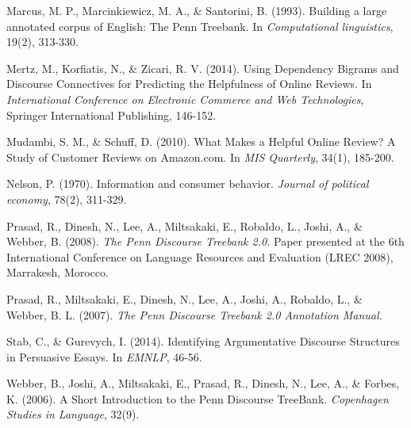 \documentclass[
    a4paper,%
    12pt,%
    oneside,%
    toc=bibliography,
    final,
]{scrartcl}
\begin{document}
\begin{thebibliography}{9}
 Marcus, M. P., Marcinkiewicz, M. A., \& Santorini, B. (1993). Building a large annotated corpus of English: The Penn Treebank. In \textit{Computational linguistics}, 19(2), 313-330.

 Mertz, M., Korfiatis, N., \& Zicari, R. V. (2014). Using Dependency Bigrams and Discourse Connectives for Predicting the Helpfulness of Online Reviews. In \textit{International Conference on Electronic Commerce and Web Technologies}, Springer International Publishing, 146-152.

 Mudambi, S. M., \& Schuff, D. (2010). What Makes a Helpful Online Review? A Study of Customer Reviews on Amazon.com. In \textit{MIS Quarterly}, 34(1), 185-200.

 Nelson, P. (1970). Information and consumer behavior. \textit{Journal of political economy}, 78(2), 311-329.

 Prasad, R., Dinesh, N., Lee, A., Miltsakaki, E., Robaldo, L., Joshi, A., \& Webber, B. (2008). \textit{The Penn Discourse Treebank 2.0.} Paper presented at the 6th International Conference on Language Resources and Evaluation (LREC 2008), Marrakesh, Morocco.

 Prasad, R., Miltsakaki, E., Dinesh, N., Lee, A., Joshi, A., Robaldo, L., \& Webber, B. L. (2007). \textit{The Penn Discourse Treebank 2.0 Annotation Manual.}

 Stab, C., \& Gurevych, I. (2014). Identifying Argumentative Discourse Structures in Persuasive Essays. In \textit{EMNLP}, 46-56.

 Webber, B., Joshi, A., Miltsakaki, E., Prasad, R., Dinesh, N., Lee, A., \& Forbes, K. (2006). A Short Introduction to the Penn Discourse TreeBank. \textit{Copenhagen Studies in Language}, 32(9).

\end{thebibliography}
\end{document}
